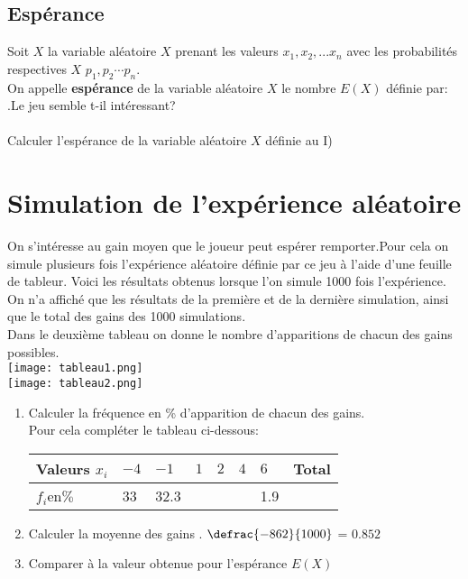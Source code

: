 \documentclass[10pt,a4paper]{article}
\theoremstyle{break}
\begin{document}
\begin{enumerate}
			 \section{Espérance}
				 Soit $X$ la variable aléatoire $X$ prenant les valeurs $x_1,x_2,...x_n$ avec les probabilités respectives
		  $X$ $p_1,p_2\cdots p_n$.\\
		    		
		  	 On appelle \textbf{espérance} de la variable aléatoire $X$ le nombre $E(X)$ définie par:\\ .Le jeu semble t-il intéressant?
		 \\ \\
		 Calculer l'espérance de la variable aléatoire $X$ définie au I)
	\end{enumerate}
			\section{Simulation de l'expérience aléatoire}
			On s'intéresse au gain moyen que le joueur peut espérer remporter.Pour cela on simule plusieurs fois l'expérience aléatoire définie par ce jeu à l'aide d'une feuille de tableur.
			Voici les résultats obtenus lorsque l'on simule 1000 fois l'expérience.
			On n'a affiché que les résultats de la première et de la dernière simulation, ainsi que le total des gains des 1000 simulations.\\Dans le deuxième tableau on donne le nombre d'apparitions de chacun des gains possibles.\\
			
		
	\texttt{[image: tableau1.png]}\\

\texttt{[image: tableau2.png]}\\

			\begin{enumerate}
				\item Calculer la fréquence en \%  d'apparition de chacun des gains.\\
					Pour cela compléter le tableau ci-dessous:\\
					\begin{center}
							\begin{tabular}{|C{3cm}|C{1cm}|C{1cm}|C{1cm}|C{1cm}|C{1cm}|C{1cm}|C{2cm}|}
								\hline
							 Valeurs $x_i$ &$-4 $ & $-1 $ & $1 $ & $2 $ & $4 $ & $6 $ &Total \\
							 \hline
							 $f_i $en$ \%$&33&32.3&&&&1.9&\\
							 \hline
							\end{tabular}
					\end{center}
					\item Calculer la moyenne des gains . $\defrac{-862}{1000}$ = $0.852$
					\item Comparer à la valeur obtenue pour l'espérance $E(X)$
			\end{enumerate}
		~\smallskip
				
\end{document}

